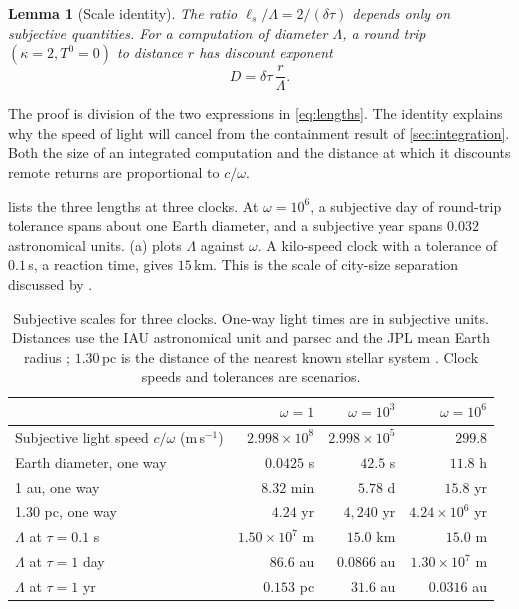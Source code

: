 \documentclass[11pt,a4paper]{article}
\newtheorem{lemma}[proposition]{Lemma}
\theoremstyle{definition}
\newcommand{\ls}{\ell_s}
\begin{document}
\begin{lemma}[Scale identity]
\label{lem:scale-identity}
The ratio $\ls/\Lambda=2/(\delta\tau)$ depends only on subjective quantities.
For a computation of diameter $\Lambda$, a round trip $(\kappa=2,T^0=0)$ to
distance $r$ has discount exponent
\begin{equation}
 D=\delta\tau\,\frac r\Lambda .
 \label{eq:scale-identity}
\end{equation}
\end{lemma}
\noindent The proof is division of the two expressions in \cref{eq:lengths}.
The identity explains why the speed of light will cancel from the containment
result of \cref{sec:integration}. Both the size of an integrated computation
and the distance at which it discounts remote returns are proportional to
$c/\omega$.

 lists the three lengths at three clocks. At $\omega=10^6$, a
subjective day of round-trip tolerance spans about one Earth diameter, and a
subjective year spans $0.032$ astronomical units. (a) plots
$\Lambda$ against $\omega$. A kilo-speed clock with a tolerance of $0.1\,$s,
a reaction time, gives $15\,$km. This is the scale of city-size separation
discussed by \citet{Hanson2016Em}.

\begin{table}[tbp]
\centering\small
\caption{Subjective scales for three clocks. One-way light times are in
subjective units. Distances use the IAU astronomical unit and parsec and the
JPL mean Earth radius \citep{JPLPhysical}; $1.30\,$pc is the distance of the
nearest known stellar system \citep{Reyle2021}. Clock speeds and tolerances are
scenarios.}
\label{tab:scales}
\begin{tabular}{@{}lrrr@{}}\toprule
 & $\omega=1$ & $\omega=10^3$ & $\omega=10^6$\\\midrule
Subjective light speed $c/\omega$ (m\,s$^{-1}$) & $2.998\times10^8$ & $2.998\times10^5$ & $299.8$\\
Earth diameter, one way & $0.0425$ s & $42.5$ s & $11.8$ h\\
1 au, one way & $8.32$ min & $5.78$ d & $15.8$ yr\\
1.30 pc, one way & $4.24$ yr & $4{,}240$ yr & $4.24\times10^6$ yr\\\midrule
$\Lambda$ at $\tau=0.1$ s & $1.50\times10^7$ m & $15.0$ km & $15.0$ m\\
$\Lambda$ at $\tau=1$ day & $86.6$ au & $0.0866$ au & $1.30\times10^7$ m\\
$\Lambda$ at $\tau=1$ yr & $0.153$ pc & $31.6$ au & $0.0316$ au\\\bottomrule
\end{tabular}
\end{table}
\end{document}
